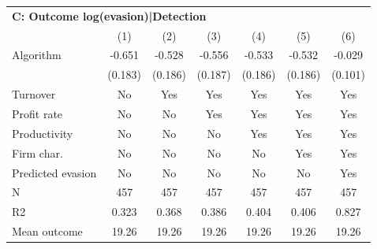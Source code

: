 \begin{tabular}{lcccccc}
\midrule \multicolumn{7}{l}{\textbf{C: Outcome log(evasion)|Detection}} \\ \multicolumn{1}{l}{} & (1) & (2) & (3) & (4) & (5) & (6) \\ \midrule
Algorithm   &      -0.651\sym{***}&      -0.528\sym{***}&      -0.556\sym{***}&      -0.533\sym{***}&      -0.532\sym{***}&      -0.029         \\
            &     (0.183)         &     (0.186)         &     (0.187)         &     (0.186)         &     (0.186)         &     (0.101)         \\
\midrule
Turnover    &          No         &         Yes         &         Yes         &         Yes         &         Yes         &         Yes         \\
Profit rate &          No         &          No         &         Yes         &         Yes         &         Yes         &         Yes         \\
Productivity&          No         &          No         &          No         &         Yes         &         Yes         &         Yes         \\
Firm char.  &          No         &          No         &          No         &          No         &         Yes         &         Yes         \\
Predicted evasion&          No         &          No         &          No         &          No         &          No         &         Yes         \\
N           &         457         &         457         &         457         &         457         &         457         &         457         \\
R2          &       0.323         &       0.368         &       0.386         &       0.404         &       0.406         &       0.827         \\
Mean outcome&       19.26         &       19.26         &       19.26         &       19.26         &       19.26         &       19.26         \\
\bottomrule \end{tabular}
